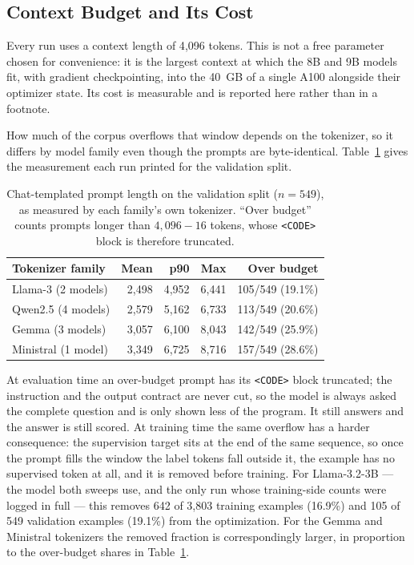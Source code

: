 \subsection{Context Budget and Its Cost}
\label{sec:context_budget}

Every run uses a context length of 4{,}096 tokens. This is not a free parameter chosen for convenience: it is the largest context at which the 8B and 9B models fit, with gradient checkpointing, into the 40~GB of a single A100 alongside their optimizer state. Its cost is measurable and is reported here rather than in a footnote.

How much of the corpus overflows that window depends on the tokenizer, so it differs by model family even though the prompts are byte-identical. Table~\ref{tab:context_overflow} gives the measurement each run printed for the validation split.

\begin{table}[H]
\centering
\caption{Chat-templated prompt length on the validation split ($n=549$), as
measured by each family's own tokenizer. ``Over budget'' counts prompts longer
than $4{,}096-16$ tokens, whose \texttt{<CODE>} block is therefore truncated.}
\label{tab:context_overflow}
\footnotesize
\begin{tabular}{l r r r r}
\toprule
\textbf{Tokenizer family} & \textbf{Mean} & \textbf{p90} & \textbf{Max} & \textbf{Over budget} \\
\midrule
Llama-3 (2 models)     & 2{,}498 & 4{,}952 & 6{,}441 & 105/549 (19.1\%) \\
Qwen2.5 (4 models)     & 2{,}579 & 5{,}162 & 6{,}733 & 113/549 (20.6\%) \\
Gemma (3 models)       & 3{,}057 & 6{,}100 & 8{,}043 & 142/549 (25.9\%) \\
Ministral (1 model)    & 3{,}349 & 6{,}725 & 8{,}716 & 157/549 (28.6\%) \\
\bottomrule
\end{tabular}
\end{table}

At evaluation time an over-budget prompt has its \texttt{<CODE>} block truncated; the instruction and the output contract are never cut, so the model is always asked the complete question and is only shown less of the program. It still answers and the answer is still scored. At training time the same overflow has a harder consequence: the supervision target sits at the end of the same sequence, so once the prompt fills the window the label tokens fall outside it, the example has no supervised token at all, and it is removed before training. For Llama-3.2-3B --- the model both sweeps use, and the only run whose training-side counts were logged in full --- this removes 642 of 3{,}803 training examples (16.9\%) and 105 of 549 validation examples (19.1\%) from the optimization. For the Gemma and Ministral tokenizers the removed fraction is correspondingly larger, in proportion to the over-budget shares in Table~\ref{tab:context_overflow}.

